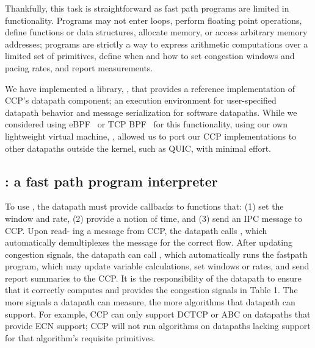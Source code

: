 Thankfully, this task is straightforward as fast path programs are limited in functionality.
Programs may not enter loops, perform floating point operations, define functions or data structures, allocate memory, or access arbitrary memory addresses; programs are strictly a way to express arithmetic computations over a limited set of primitives, define when and how to set congestion windows and pacing rates, and report measurements.

We have implemented a library, , that provides a reference
implementation of CCP's datapath component; \ie an execution environment for
user-specified datapath behavior and message serialization for software
datapaths. While we considered using eBPF~\cite{ebpf} or TCP BPF~\cite{tcpbpf}
for this functionality, using our own lightweight virtual machine, ,
allowed us to port our CCP implementations to other datapaths outside the
kernel, such as QUIC, with minimal effort.

\subsection{: a fast path program interpreter}
\label{s:datapath:libccp}
To use , the datapath must provide callbacks to functions that: (1) set the window and rate, (2) provide a notion of time, and (3) send an IPC message to CCP. Upon read- ing a message from CCP, the datapath calls , which automatically demultiplexes the message for the correct flow. After updating congestion signals, the datapath can call , which automatically runs the fastpath program, which may update variable calculations, set windows or rates, and send report summaries to the CCP. It is the responsibility of the datapath to ensure that it correctly computes and provides the congestion signals in Table 1.
The more signals a datapath can measure, the more algorithms that datapath can support. For example, CCP can only support DCTCP \cite{DCTCP} or ABC \cite{abc} on datapaths that provide ECN support; CCP will not run algorithms on datapaths lacking support for that algorithm’s requisite primitives.

